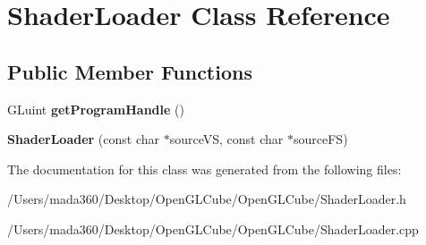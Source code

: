 \hypertarget{class_shader_loader}{}\section{Shader\+Loader Class Reference}
\label{class_shader_loader}
\subsection*{Public Member Functions}
\begin{DoxyCompactItemize}
\item 
\hypertarget{class_shader_loader_a2d1ca186f96a158d7a47ad4605d87f4d}{}G\+Luint {\bfseries get\+Program\+Handle} ()\label{class_shader_loader_a2d1ca186f96a158d7a47ad4605d87f4d}

\item 
\hypertarget{class_shader_loader_a5a271cb63e8366c5eb79939d0dac6e88}{}{\bfseries Shader\+Loader} (const char $\ast$source\+V\+S, const char $\ast$source\+F\+S)\label{class_shader_loader_a5a271cb63e8366c5eb79939d0dac6e88}

\end{DoxyCompactItemize}


The documentation for this class was generated from the following files\+:\begin{DoxyCompactItemize}
\item 
/\+Users/mada360/\+Desktop/\+Open\+G\+L\+Cube/\+Open\+G\+L\+Cube/Shader\+Loader.\+h\item 
/\+Users/mada360/\+Desktop/\+Open\+G\+L\+Cube/\+Open\+G\+L\+Cube/Shader\+Loader.\+cpp\end{DoxyCompactItemize}
